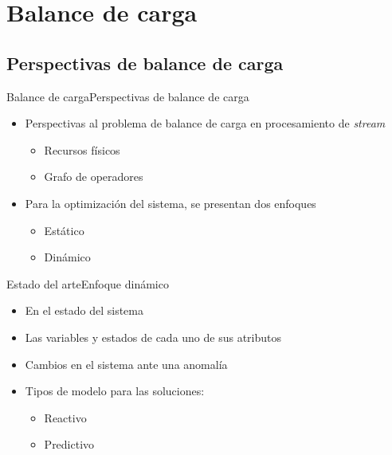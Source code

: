 \section{Balance de carga}
\subsection*{Perspectivas de balance de carga}
\begin{frame}{Balance de carga}{Perspectivas de balance de carga}
\begin{itemize}
\item Perspectivas al problema de balance de carga en procesamiento de \textsl{stream}
\begin{itemize}
	\item Recursos físicos
	\item Grafo de operadores
\end{itemize}
\item Para la optimización del sistema, se presentan dos enfoques \cite{Dong06schedulingalgorithms}
\begin{itemize}
	\item Estático
	\item Dinámico
\end{itemize}
\end{itemize}
\end{frame}

\begin{frame}{Estado del arte}{Enfoque dinámico}
\begin{itemize}
\item En el estado del sistema
\item Las variables y estados de cada uno de sus atributos
\item Cambios en el sistema ante una anomalía
\item Tipos de modelo para las soluciones:
\begin{itemize}
	\item Reactivo \cite{GulisanoJPSV12}
	\item Predictivo \cite{NguyenSGSW13}
\end{itemize}
\end{itemize}
\end{frame}

